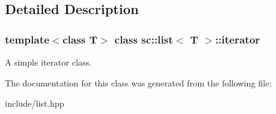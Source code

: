 \subsection{Detailed Description}
\subsubsection*{template$<$class T$>$\newline
class sc\+::list$<$ T $>$\+::iterator}

A simple iterator class. 

The documentation for this class was generated from the following file\+:\begin{DoxyCompactItemize}
\item 
include/list.\+hpp\end{DoxyCompactItemize}
